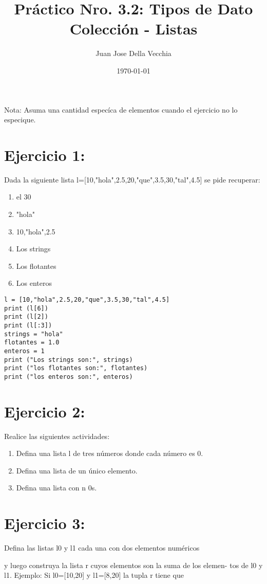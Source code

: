 \documentclass[11pt]{article}
\author{Juan Jose Della Vecchia}
\date{\today}
\title{Práctico Nro. 3.2: Tipos de Dato Colección - Listas}
\begin{document}
\maketitle
\tableofcontents

Nota: Asuma una cantidad especíca de elementos cuando el ejercicio no lo
especique.

\section{Ejercicio 1:}
\label{sec:org10421aa}
Dada la siguiente lista l=[10,"hola",2.5,20,"que",3.5,30,"tal",4.5]
se pide recuperar:
\begin{enumerate}
\item el 30
\item "hola"
\item 10,"hola",2.5
\item Los strings
\item Los flotantes
\item Los enteros
\end{enumerate}
\begin{verbatim}
l = [10,"hola",2.5,20,"que",3.5,30,"tal",4.5]
print (l[6])
print (l[2])
print (l[:3])
strings = "hola"
flotantes = 1.0
enteros = 1
print ("Los strings son:", strings)
print ("los flotantes son:", flotantes)
print ("los enteros son:", enteros)
\end{verbatim}

\section{Ejercicio 2:}
\label{sec:orgbb84a5f}
Realice las siguientes actividades:
\begin{enumerate}
\item Defina una lista l de tres números donde cada número es 0.
\item Defina una lista de un único elemento.
\item Defina una lista con n 0s.
\end{enumerate}
\section{Ejercicio 3:}
\label{sec:orgd6edd58}
Defina las listas l0 y l1 cada una con dos elementos numéricos

y luego construya la lista r cuyos elementos son la suma de los elemen-
tos de l0 y l1. Ejemplo: Si l0=[10,20] y l1=[8,20] la tupla r tiene que
\end{document}
